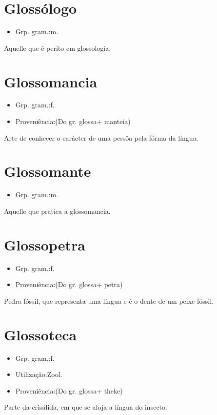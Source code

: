\section{Glossólogo}
\begin{itemize}
\item {Grp. gram.:m.}
\end{itemize}
Aquelle que é perito em glossologia.
\section{Glossomancia}
\begin{itemize}
\item {Grp. gram.:f.}
\end{itemize}
\begin{itemize}
\item {Proveniência:(Do gr. \textunderscore glossa\textunderscore  + \textunderscore manteia\textunderscore )}
\end{itemize}
Arte de conhecer o carácter de uma pessôa pela fórma da língua.
\section{Glossomante}
\begin{itemize}
\item {Grp. gram.:m.}
\end{itemize}
Aquelle que pratica a glossomancia.
\section{Glossopetra}
\begin{itemize}
\item {Grp. gram.:f.}
\end{itemize}
\begin{itemize}
\item {Proveniência:(Do gr. \textunderscore glossa\textunderscore  + \textunderscore petra\textunderscore )}
\end{itemize}
Pedra fóssil, que representa uma língua e é o dente de um peixe fóssil.
\section{Glossoteca}
\begin{itemize}
\item {Grp. gram.:f.}
\end{itemize}
\begin{itemize}
\item {Utilização:Zool.}
\end{itemize}
\begin{itemize}
\item {Proveniência:(Do gr. \textunderscore glossa\textunderscore  + \textunderscore theke\textunderscore )}
\end{itemize}
Parte da crisálida, em que se aloja a língua do insecto.
